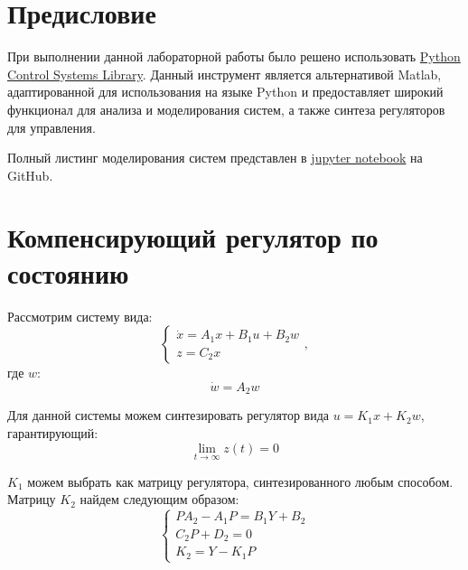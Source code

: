 \tableofcontents
\section*{Предисловие}
При выполнении данной лабораторной работы было решено использовать 
\href{https://python-control.readthedocs.io/en/0.9.4/}{Python Control Systems Library}.
Данный инструмент является альтернативой Matlab, адаптированной для использования на 
языке Python и предоставляет широкий функционал для анализа и моделирования систем,
а также синтеза регуляторов для управления.

Полный листинг моделирования систем представлен в \href{https://github.com/diuzhevVlad/control-theory-itmo-fall-2023/blob/main/Lab12/Lab12.ipynb}{jupyter notebook} на GitHub.

\pagebreak

\section{Компенсирующий регулятор по состоянию}

Рассмотрим систему вида:
\begin{equation}
    \begin{cases}
        \dot{x} = A_1x + B_1u + B_2w \\
        z = C_2x
    \end{cases},
\end{equation}
где $w$:
\begin{equation}
    \dot{w} = A_2w
\end{equation}

Для данной системы можем синтезировать регулятор вида $u = K_1x + K_2w$, гарантирующий:
\begin{equation*}
    \lim_{t\to\infty} z(t) = 0
\end{equation*}

$K_1$ можем выбрать как матрицу регулятора, синтезированного любым способом. Матрицу $K_2$ найдем следующим образом:
\begin{equation}
    \begin{cases}
        PA_2 - A_1P = B_1Y + B_2\\
        C_2P + D_2 = 0 \\
        K_2 = Y - K_1P
    \end{cases}
\end{equation}

